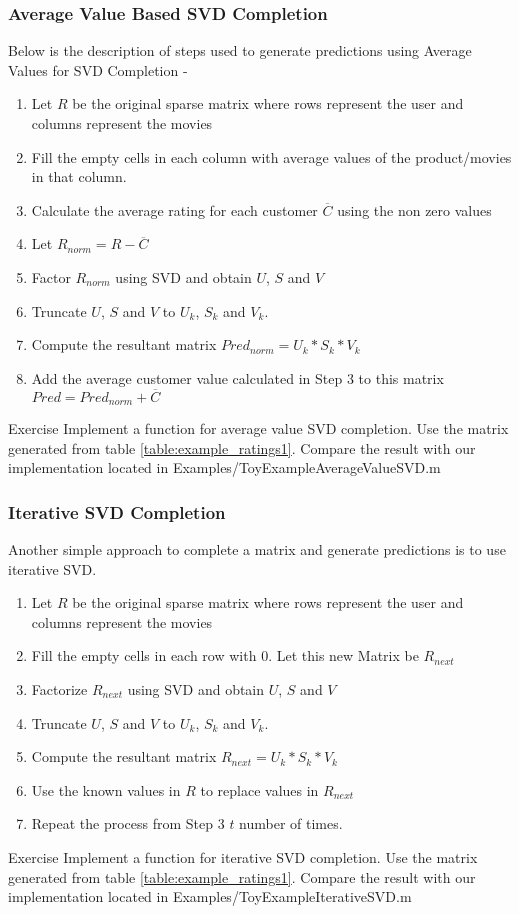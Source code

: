   \subsubsection{Average Value Based SVD Completion}
  Below is the description of steps used to generate predictions using Average Values for SVD Completion -
  \begin{enumerate}
    \item Let $R$ be the original sparse matrix where rows represent the user and columns represent the movies
    \item Fill the empty cells in each column with average values of the product/movies in that column.
    \item Calculate the average rating for each customer $\overline{C}$ using the non zero values
    \item Let $R_{norm} = R - \overline{C}$  
    \item Factor $R_{norm}$ using SVD and obtain $U$, $S$ and $V$
    \item Truncate $U$, $S$ and $V$ to $U_k$, $S_k$ and $V_k$.
    \item Compute the resultant matrix $Pred_{norm} = U_k*S_k*V_k$
    \item Add the average customer value calculated in Step 3 to this matrix $Pred = Pred_{norm} + \overline{C} $
  \end{enumerate}
\begin{myremark}{Exercise }
Implement a function for average value SVD completion. Use the matrix generated from table \ref{table:example_ratings1}. Compare the result with our implementation located in Examples/ToyExampleAverageValueSVD.m
\end{myremark}
  \subsubsection{Iterative SVD Completion}
  Another simple approach to complete a matrix and generate predictions is to use iterative SVD. 
  \begin{enumerate}
    \item Let $R$ be the original sparse matrix where rows represent the user and columns represent the movies
    \item Fill the empty cells in each row with 0. Let this new Matrix be $R_{next}$
    \item Factorize $R_{next}$ using SVD and obtain $U$, $S$ and $V$
    \item Truncate $U$, $S$ and $V$ to $U_k$, $S_k$ and $V_k$.
    \item Compute the resultant matrix $R_{next} = U_k*S_k*V_k$
    \item Use the known values in $R$ to replace values in $R_{next}$
    \item Repeat the process from Step 3 $t$ number of times.
  \end{enumerate}
\begin{myremark}{Exercise }
Implement a function for iterative SVD completion. Use the matrix generated from table \ref{table:example_ratings1}. Compare the result with our implementation located in Examples/ToyExampleIterativeSVD.m
\end{myremark}
